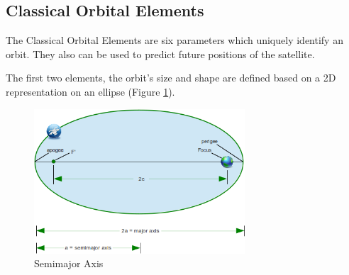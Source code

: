 \pagebreak
\subsection{Classical Orbital Elements}\label{2.2}
The Classical Orbital Elements are six parameters which uniquely identify an orbit. They also can be used to predict future positions of the satellite.\cite{IntAstr}

The first two elements, the orbit's size and shape are defined based on a 2D representation on an ellipse (Figure \ref{f2.1}).

\begin{figure}[H]
\centerline{\includegraphics[width=0.7\textwidth]{images/Ellipse.png}}
\caption{Semimajor Axis}
\label{f2.1}
\end{figure}

